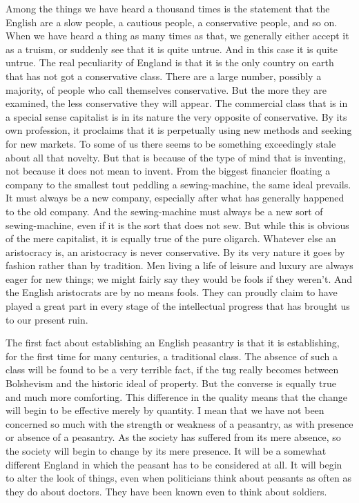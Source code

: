 \documentclass{book}
\begin{document}
Among the things we have heard a thousand times is the statement that the English are a slow people, a cautious people, a conservative people, and so on. When we have heard a thing as many times as that, we generally either accept it as a truism, or suddenly see that it is quite untrue. And in this case it is quite untrue. The real peculiarity of England is that it is the only country on earth that has not got a conservative class. There are a large number, possibly a majority, of people who call themselves conservative. But the more they are examined, the less conservative they will appear. The commercial class that is in a special sense capitalist is in its nature the very opposite of conservative. By its own profession, it proclaims that it is perpetually using new methods and seeking for new markets. To some of us there seems to be something exceedingly stale about all that novelty. But that is because of the type of mind that is inventing, not because it does not mean to invent. From the biggest financier floating a company to the smallest tout peddling a sewing-machine, the same ideal prevails. It must always be a new company, especially after what has generally happened to the old company. And the sewing-machine must always be a new sort of sewing-machine, even if it is the sort that does not sew. But while this is obvious of the mere capitalist, it is equally true of the pure oligarch. Whatever else an aristocracy is, an aristocracy is never conservative. By its very nature it goes by fashion rather than by tradition. Men living a life of leisure and luxury are always eager for new things; we might fairly say they would be fools if they weren’t. And the English aristocrats are by no means fools. They can proudly claim to have played a great part in every stage of the intellectual progress that has brought us to our present ruin.

The first fact about establishing an English peasantry is that it is establishing, for the first time for many centuries, a traditional class. The absence of such a class will be found to be a very terrible fact, if the tug really becomes between Bolshevism and the historic ideal of property. But the converse is equally true and much more comforting. This difference in the quality means that the change will begin to be effective merely by quantity. I mean that we have not been concerned so much with the strength or weakness of a peasantry, as with presence or absence of a peasantry. As the society has suffered from its mere absence, so the society will begin to change by its mere presence. It will be a somewhat different England in which the peasant has to be considered at all. It will begin to alter the look of things, even when politicians think about peasants as often as they do about doctors. They have been known even to think about soldiers.
\end{document}
